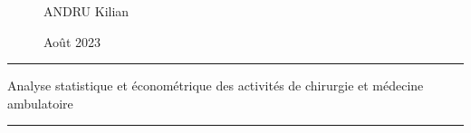 \documentclass[12pt]{extarticle}
\begin{document}
\renewcommand{\refname}{}


\thispagestyle{plain}

\begin{figure}[!h]
    \centering
    \begin{minipage}{0.45 \linewidth}
        \centering
        \Large{ANDRU Kilian}
    \end{minipage}
    \hfill
    \begin{minipage}{0.48 \linewidth}
        \centering
        \Large{Août 2023}
    \end{minipage}
\end{figure}

\bigskip

\hrule
\begin{center}
    \Huge{Analyse statistique et économétrique des activités de chirurgie et médecine ambulatoire}
\end{center}
\hrule

\bigskip
\bigskip

\tableofcontents

\newpage



\newpage



\newpage



\newpage


\end{document}
